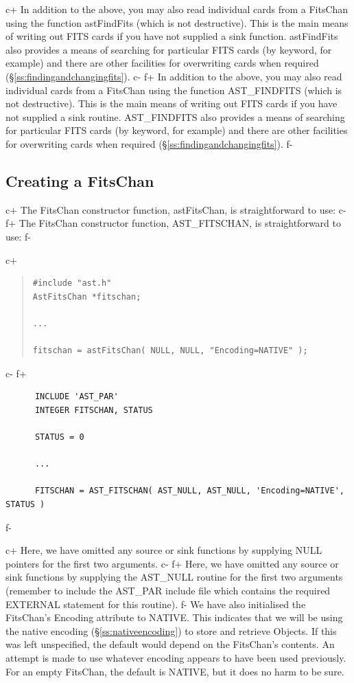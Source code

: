 \documentclass[twoside,11pt]{article}
\newcommand{\secref}[1]{\S\ref{#1}}
\newcommand{\secref}[1]{\ref{#1}}
\begin{document}
c+
In addition to the above, you may also read individual cards from a
FitsChan using the function astFindFits (which is not
destructive). This is the main means of writing out FITS cards if you
have not supplied a sink function.  astFindFits also provides a means
of searching for particular FITS cards (by keyword, for example) and
there are other facilities for overwriting cards when required
(\secref{ss:findingandchangingfits}).
c-
f+
In addition to the above, you may also read individual cards from a
FitsChan using the function AST\_FINDFITS (which is not
destructive). This is the main means of writing out FITS cards if you
have not supplied a sink routine.  AST\_FINDFITS also provides a means
of searching for particular FITS cards (by keyword, for example) and
there are other facilities for overwriting cards when required
(\secref{ss:findingandchangingfits}).
f-

\subsection{\label{ss:creatingafitschan}Creating a FitsChan}

c+
The FitsChan constructor function, astFitsChan, is straightforward to
use:
c-
f+
The FitsChan constructor function, AST\_FITSCHAN, is straightforward
to use:
f-

c+
\begin{quote}
\small
\begin{verbatim}
#include "ast.h"
AstFitsChan *fitschan;

...

fitschan = astFitsChan( NULL, NULL, "Encoding=NATIVE" );
\end{verbatim}
\normalsize
\end{quote}
c-
f+
\small
\begin{verbatim}
      INCLUDE 'AST_PAR'
      INTEGER FITSCHAN, STATUS

      STATUS = 0

      ...

      FITSCHAN = AST_FITSCHAN( AST_NULL, AST_NULL, 'Encoding=NATIVE', STATUS )
\end{verbatim}
\normalsize
f-

c+
Here, we have omitted any source or sink functions by supplying NULL
pointers for the first two arguments.
c-
f+
Here, we have omitted any source or sink functions by supplying the
AST\_NULL routine for the first two arguments (remember to include the
AST\_PAR include file which contains the required EXTERNAL statement
for this routine).
f-
We have also initialised the FitsChan's Encoding attribute to
NATIVE. This indicates that we will be using the native encoding
(\secref{ss:nativeencoding}) to store and retrieve Objects. If this
was left unspecified, the default would depend on the FitsChan's
contents. An attempt is made to use whatever encoding appears to have
been used previously. For an empty FitsChan, the default is NATIVE,
but it does no harm to be sure.
\end{document}
